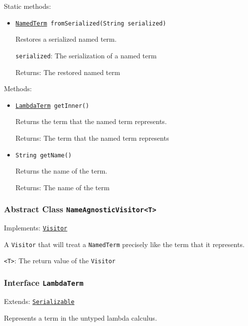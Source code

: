 Static methods:
\begin{itemize}
\item \texttt{\hyperref[type:edu.kit.wavelength.client.model.term.NamedTerm]{NamedTerm} fromSerialized(String serialized)}

Restores a serialized named term.

\texttt{serialized}: The serialization of a named term

Returns: The restored named term

\end{itemize}

Methods:
\begin{itemize}
\item \texttt{\hyperref[type:edu.kit.wavelength.client.model.term.LambdaTerm]{LambdaTerm} getInner()}

Returns the term that the named term represents.

Returns: The term that the named term represents

\item \texttt{String getName()}

Returns the name of the term.

Returns: The name of the term

\end{itemize}

\subsubsection{Abstract Class \texttt{NameAgnosticVisitor<T>}}
\label{type:edu.kit.wavelength.client.model.term.NameAgnosticVisitor}
Implements: \texttt{\hyperref[type:edu.kit.wavelength.client.model.term.Visitor]{Visitor}}

A \texttt{Visitor} that will treat a \texttt{NamedTerm} precisely like the term
 that it represents.

\texttt{<T>}: The return value of the \texttt{Visitor}

\subsubsection{Interface \texttt{LambdaTerm}}
\label{type:edu.kit.wavelength.client.model.term.LambdaTerm}
Extends: \texttt{\hyperref[type:edu.kit.wavelength.client.model.serialization.Serializable]{Serializable}}

Represents a term in the untyped lambda calculus.

